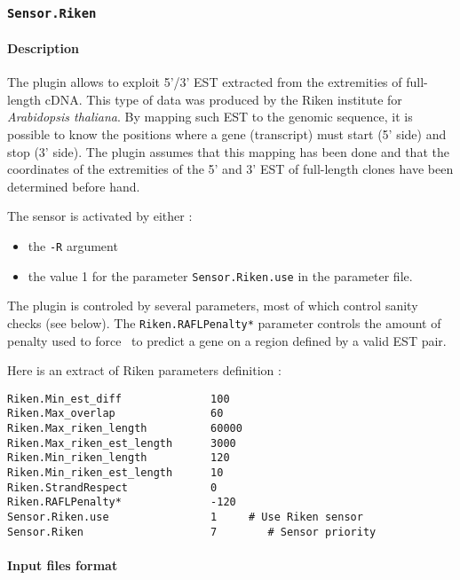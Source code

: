 
\subsubsection{\texttt{Sensor.Riken}}

\paragraph{Description}

The plugin allows to exploit 5'/3' EST extracted from the extremities
of full-length cDNA. This type of data was produced by the Riken
institute for \emph{Arabidopsis thaliana}. By mapping such EST to the genomic
sequence, it is possible to know the positions where a gene
(transcript) must start (5' side) and stop (3' side). The plugin
assumes that this mapping has been done and that the coordinates of
the extremities of the 5' and 3' EST of full-length clones have been
determined before hand.

The sensor is activated by either :
\begin{itemize}
\item the \texttt{-R} argument 
\item the value 1 for the parameter \texttt{Sensor.Riken.use} in the
  parameter file.
\end{itemize}

The plugin is controled by several parameters, most of which control
sanity checks (see below). The \texttt{Riken.RAFLPenalty*} parameter
controls the amount of penalty used to force \EuGene\ to predict a
gene on a region defined by a valid EST pair.

Here is an extract of Riken parameters definition :
\begin{Verbatim}[fontsize=\small]
Riken.Min_est_diff              100
Riken.Max_overlap               60
Riken.Max_riken_length          60000
Riken.Max_riken_est_length      3000
Riken.Min_riken_length          120 
Riken.Min_riken_est_length      10
Riken.StrandRespect             0
Riken.RAFLPenalty*              -120
Sensor.Riken.use                1     # Use Riken sensor
Sensor.Riken                    7        # Sensor priority
\end{Verbatim}

\paragraph{Input files format}

